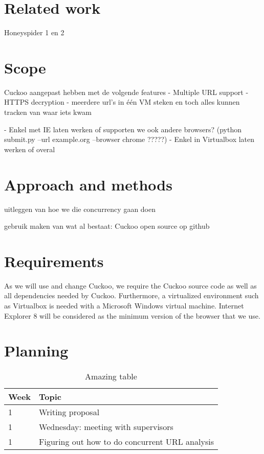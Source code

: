 \documentclass{scrartcl}
\begin{document}
\section{Related work}



Honeyspider 1 en 2

\section{Scope}

	Cuckoo aangepast hebben met de volgende features
		- Multiple URL support
		- HTTPS decryption
		- meerdere url's in één VM steken en toch alles kunnen tracken van waar iets kwam


 - Enkel met IE laten werken of supporten we ook andere browsers?
	(python submit.py --url example.org --browser chrome ?????)
 - Enkel in Virtualbox laten werken of overal


\section{Approach and methods}

uitleggen van hoe we die concurrency gaan doen

gebruik maken van wat al bestaat: Cuckoo
open source op github


\section{Requirements}

As we will use and change Cuckoo, we require the Cuckoo source code as well as all dependencies needed by Cuckoo. Furthermore, a virtualized environment such as Virtualbox is needed with a Microsoft Windows virtual machine. Internet Explorer 8 will be considered as the minimum version of the browser that we use.

\section{Planning}

\begin{table}
\centering
\begin{tabular}{ | l | l |}
\hline
Week & Topic \\ \hline
1 & Writing proposal \\
1 & Wednesday: meeting with supervisors \\
1 & Figuring out how to do concurrent URL analysis \\
\hline
\end{tabular}
\caption{Amazing table}
\label{tbl-planning}
\end{table}
\end{document}

